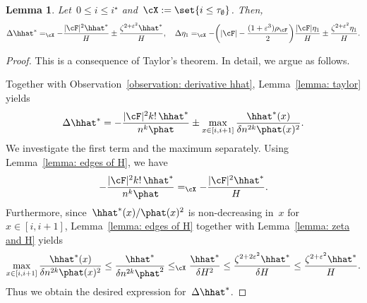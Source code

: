 \documentclass[11pt]{amsart}
\newcommand{\eps}{\varepsilon}
\DeclarePairedDelimiter{\paren}{\lparen}{\rparen}
\DeclarePairedDelimiter{\abs}{\lvert}{\rvert}
\newcommand{\Xleq}{\leq_{\cX}}
\newcommand{\Xeq}{=_{\cX}}
\newtheorem{lemma}[algocf]{Lemma}
\theoremstyle{definition}
\numberwithin{equation}{section}
\begin{document}
	\begin{lemma}\label{lemma: delta hhat, delta eta}
		Let~$0\leq i\leq i^\star$ and~$\cX:=\set{i\leq \tau_\emptyset}$.
		Then,
		\begin{equation*}
			\Delta\hhat^*\Xeq -\frac{\abs{\cF}^2\hhat^*}{H}\pm \frac{\zeta^{2+\eps^2}\hhat^*}{H},\quad
			\Delta \eta_1\Xeq -\paren[\bigg]{\abs{\cF}-\frac{(1+\eps^3)\rho_\cF}{2}} \frac{\abs{\cF}\eta_1}{H}\pm \frac{\zeta^{2+\eps^2}\eta_1}{H}.
		\end{equation*}
	\end{lemma}
	\begin{proof}
		This is a consequence of Taylor's theorem.
		In detail, we argue as follows.
		
		Together with Observation~\ref{observation: derivative hhat}, Lemma~\ref{lemma: taylor} yields
		\begin{equation*}
			\Delta\hhat^*
			=-\frac{\abs{\cF}^2k!\,\hhat^*}{n^k\phat}\pm \max_{x\in[i,i+1]} \frac{\hhat^*(x)}{\delta n^{2k}\phat(x)^2}.
		\end{equation*}
		We investigate the first term and the maximum separately.
		Using Lemma~\ref{lemma: edges of H}, we have
		\begin{equation*}
			-\frac{\abs{\cF}^2k!\,\hhat^*}{n^k\phat}
			\Xeq-\frac{\abs{\cF}^2\hhat^*}{H}.
		\end{equation*}
		Furthermore, since~$\hhat^*(x)/\phat(x)^2$ is non-decreasing in~$x$ for~$x\in[i,i+1]$, Lemma~\ref{lemma: edges of H} together with Lemma~\ref{lemma: zeta and H} yields
		\begin{equation*}
			\max_{x\in[i,i+1]} \frac{\hhat^*(x)}{\delta n^{2k}\phat(x)^2}
			\leq \frac{\hhat^*}{\delta n^{2k}\phat^2}
			\Xleq \frac{\hhat^*}{\delta H^2}
			\leq \frac{\zeta^{2+2\eps^2}\hhat^*}{\delta H}
			\leq \frac{\zeta^{2+\eps^2}\hhat^*}{H}.
		\end{equation*}
		Thus we obtain the desired expression for~$\Delta\hhat^*$.
		

\end{proof}
\end{document}
